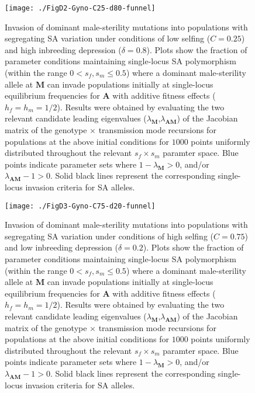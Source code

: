 \documentclass{article}
\begin{document}
\begin{figure}[ht!]
\centering
\texttt{[image: ./FigD2-Gyno-C25-d80-funnel]}
\caption{Invasion of dominant male-sterility mutations into populations with segregating SA variation under conditions of low selfing ($C = 0.25$) and high inbreeding depression ($\delta = 0.8$). Plots show the fraction of parameter conditions maintaining single-locus SA polymorphism (within the range $0 < s_f,s_m \leq 0.5$) where a dominant male-sterility allele at $\mathbf{M}$ can invade populations initially at single-locus equilibrium frequencies for $\mathbf{A}$ with additive fitness effects ($h_f=h_m=1/2$). Results were obtained by evaluating the two relevant candidate leading eigenvalues ($\lambda_{\mathbf{M}}$,$\lambda_{\mathbf{AM}}$) of the Jacobian matrix of the genotype $\times$ transmission mode recursions for populations at the above initial conditions for $1000$ points uniformly distributed throughout the relevant $s_f \times s_m$ paramter space. Blue points indicate parameter sets where $1 - \lambda_{\mathbf{M}} > 0$, and/or $\lambda_{\mathbf{AM}} - 1 > 0$. Solid black lines represent the corresponding single-locus invasion criteria for SA alleles.}
\label{fig:GynC25d80Funnel}
\end{figure}
\newpage{}

\begin{figure}[ht!]
\centering
\texttt{[image: ./FigD3-Gyno-C75-d20-funnel]}
\caption{Invasion of dominant male-sterility mutations into populations with segregating SA variation under conditions of high selfing ($C = 0.75$) and low inbreeding depression ($\delta = 0.2$). Plots show the fraction of parameter conditions maintaining single-locus SA polymorphism (within the range $0 < s_f,s_m \leq 0.5$) where a dominant male-sterility allele at $\mathbf{M}$ can invade populations initially at single-locus equilibrium frequencies for $\mathbf{A}$ with additive fitness effects ($h_f=h_m=1/2$). Results were obtained by evaluating the two relevant candidate leading eigenvalues ($\lambda_{\mathbf{M}}$,$\lambda_{\mathbf{AM}}$) of the Jacobian matrix of the genotype $\times$ transmission mode recursions for populations at the above initial conditions for $1000$ points uniformly distributed throughout the relevant $s_f \times s_m$ paramter space. Blue points indicate parameter sets where $1 - \lambda_{\mathbf{M}} > 0$, and/or $\lambda_{\mathbf{AM}} - 1 > 0$. Solid black lines represent the corresponding single-locus invasion criteria for SA alleles.}
\label{fig:GynC75d20Funnel}
\end{figure}
\newpage{}
\end{document}
